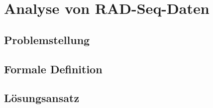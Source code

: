 \chapter{Analyse von RAD-Seq-Daten} \label{chapter:kap2}
\section{Problemstellung} \label{subsec:probl}

\section{Formale Definition} \label{subsec:formal}
\section{Lösungsansatz} \label{subsec:solution}